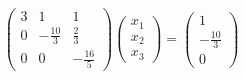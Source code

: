 \documentclass[preview]{standalone}
\begin{document}
\begin{align*}
\begin{pmatrix}3 & 1 & 1 \\ 0 & -\frac{10}{3} & \frac{2}{3} \\ 0 & 0 & -\frac{16}{5}\end{pmatrix}\begin{pmatrix} x_1 \\ x_2 \\ x_3 \end{pmatrix} = \begin{pmatrix} 1 \\ -\frac{10}{3} \\ 0 \end{pmatrix}
\end{align*}
\end{document}
